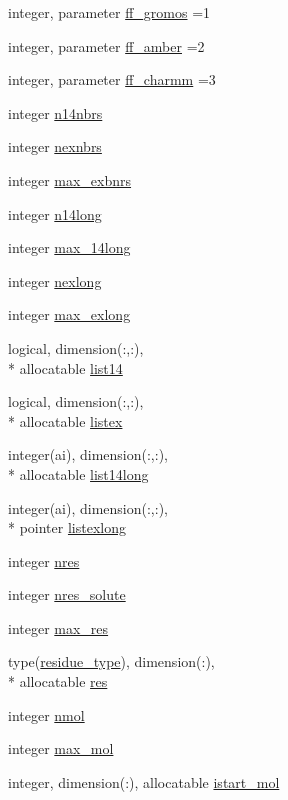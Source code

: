 \begin{DoxyCompactItemize}
\item 
integer, parameter \hyperlink{classtopo_a225be5b395f0b592cf0689d27febd07b}{ff\-\_\-gromos} =1
\item 
integer, parameter \hyperlink{classtopo_a8e1182655496f5acb43690d5141e48cd}{ff\-\_\-amber} =2
\item 
integer, parameter \hyperlink{classtopo_a0f190a378d94253fd8ba43557193bbc7}{ff\-\_\-charmm} =3
\item 
integer \hyperlink{classtopo_a6debae2aa4d0f73038d45c4d4baecd06}{n14nbrs}
\item 
integer \hyperlink{classtopo_adffc0d2559b13aa47e04b6480b856654}{nexnbrs}
\item 
integer \hyperlink{classtopo_abc0c05f5412f2af5c5ca0816d3d58ae4}{max\-\_\-exbnrs}
\item 
integer \hyperlink{classtopo_a7a7341812bbcb4ee7fb15e2bcbe7c7ab}{n14long}
\item 
integer \hyperlink{classtopo_a7ae07d7e5923afe96b6827e0697fcd3f}{max\-\_\-14long}
\item 
integer \hyperlink{classtopo_a1f5e9cb69084b2315adb19fd0530be6a}{nexlong}
\item 
integer \hyperlink{classtopo_ae9731d005feffe66fba90dbd3d247ec9}{max\-\_\-exlong}
\item 
logical, dimension(\-:,\-:), \\*
allocatable \hyperlink{classtopo_a696c4dfe06f913854120360cf5e906d0}{list14}
\item 
logical, dimension(\-:,\-:), \\*
allocatable \hyperlink{classtopo_a830745f1b19366ecd19740718c30a2a0}{listex}
\item 
integer(ai), dimension(\-:,\-:), \\*
allocatable \hyperlink{classtopo_a195827534980f9002caf554cc449bdfd}{list14long}
\item 
integer(ai), dimension(\-:,\-:), \\*
pointer \hyperlink{classtopo_ab6d13bd20fd204e5d5dac827e8d2f0d8}{listexlong}
\item 
integer \hyperlink{classtopo_a7084f73e1214464c07b24e59beb247d2}{nres}
\item 
integer \hyperlink{classtopo_a2871deb545ab811525581a49954a4b09}{nres\-\_\-solute}
\item 
integer \hyperlink{classtopo_abc8a8c2036ea05a86bfc6e383196e167}{max\-\_\-res}
\item 
type(\hyperlink{structtopo_1_1residue__type}{residue\-\_\-type}), dimension(\-:), \\*
allocatable \hyperlink{classtopo_a0867b2ae350f5df1e287c48074a88be7}{res}
\item 
integer \hyperlink{classtopo_a7ea01882bbe30eae14b394d73abaa51e}{nmol}
\item 
integer \hyperlink{classtopo_ab8596238bb7a672ce61644d634f46202}{max\-\_\-mol}
\item 
integer, dimension(\-:), allocatable \hyperlink{classtopo_a96b6bc2cb9d036ac0e8d9592233b6111}{istart\-\_\-mol}
\end{DoxyCompactItemize}

